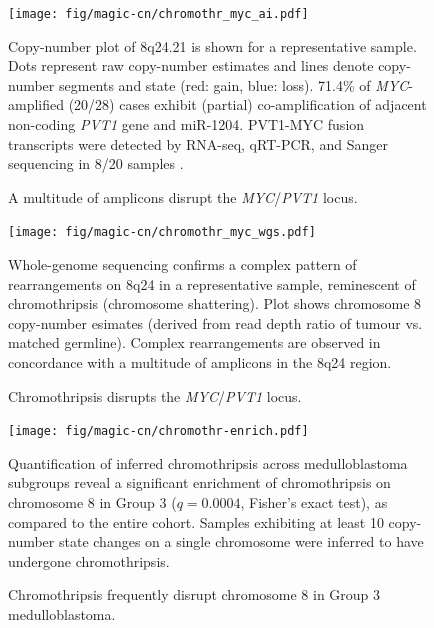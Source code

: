 \documentclass[11pt,letterpaper]{article}
\theoremstyle{definition}
\begin{document}


\begin{figure}[h]
	\begin{center}
		\texttt{[image: fig/magic-cn/chromothr\_myc\_ai.pdf]}
	\end{center}
	\caption{A multitude of amplicons disrupt the \emph{MYC}/\emph{PVT1} locus.}
	Copy-number plot of 8q24.21 is shown for a representative sample. Dots represent raw copy-number estimates and lines denote copy-number segments and state (red: gain, blue: loss). 71.4\% of \emph{MYC}-amplified (20/28) cases exhibit (partial) co-amplification of adjacent non-coding \emph{PVT1} gene and miR-1204. PVT1-MYC fusion transcripts were detected by RNA-seq, qRT-PCR, and Sanger sequencing in 8/20 samples .
	\label{fig:chromothr_myc}
\end{figure}

\begin{figure}[h]
	\begin{center}
		\texttt{[image: fig/magic-cn/chromothr\_myc\_wgs.pdf]}
	\end{center}
	\caption{Chromothripsis disrupts the \emph{MYC}/\emph{PVT1} locus.}
	Whole-genome sequencing confirms a complex pattern of rearrangements on 8q24 in a representative sample, reminescent of chromothripsis (chromosome shattering).
	Plot shows chromosome 8 copy-number esimates (derived from read depth ratio of tumour vs. matched germline).
	Complex rearrangements are observed in concordance with a multitude of amplicons in the 8q24 region.
	\label{fig:chromothr_myc_wgs}
\end{figure}

\begin{figure}[h]
	\begin{center}
		\texttt{[image: fig/magic-cn/chromothr-enrich.pdf]}
	\end{center}
	\caption{Chromothripsis frequently disrupt chromosome 8 in Group 3 medulloblastoma.}
	Quantification of inferred chromothripsis across medulloblastoma subgroups reveal a significant enrichment of chromothripsis on chromosome 8 in Group 3 ($q = 0.0004$, Fisher's exact test), as compared to the entire cohort. Samples exhibiting at least 10 copy-number state changes on a single chromosome were inferred to have undergone chromothripsis.
	\label{fig:chromothr-enrich}
\end{figure}
\end{document}
